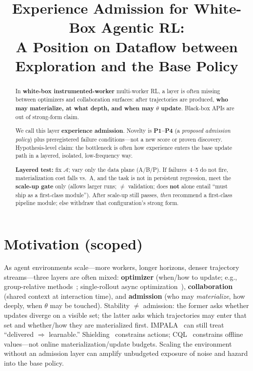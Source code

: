 \documentclass{article}
\title{Experience Admission for White-Box Agentic RL:\\
A Position on Dataflow between Exploration and the Base Policy}
\begin{document}
\maketitle

\begin{abstract}
In \textbf{white-box instrumented-worker} multi-worker RL, a layer is often missing between optimizers and collaboration surfaces: after trajectories are produced, \textbf{who may materialize, at what depth, and when may \(\theta\) update}. Black-box APIs are out of strong-form claim.

We call this layer \textbf{experience admission}. Novelty is \textbf{P1--P4} (a \emph{proposed admission policy}) plus preregistered failure conditions---not a new score or proven discovery. Hypothesis-level claim: the bottleneck is often how experience enters the base update path in a layered, isolated, low-frequency way.

\textbf{Layered test:} fix \(\mathcal{A}\); vary only the data plane (A/B/P). If failures~4--5 do not fire, materialization cost falls vs.\ A, and the task is not in persistent regression, meet the \textbf{scale-up gate} only (allows larger runs; \(\neq\) validation; does \textbf{not} alone entail ``must ship as a first-class module''). After scale-up still passes, \emph{then} recommend a first-class pipeline module; else withdraw that configuration's strong form.
\end{abstract}

\section{Motivation (scoped)}
\label{sec:motivation}

As agent environments scale---more workers, longer horizons, denser trajectory streams---three layers are often mixed: \textbf{optimizer} (when/how to update; e.g., group-relative methods~\citep{shao2024deepseekmath}; single-rollout async optimization~\citep{hou2026single}), \textbf{collaboration} (shared context at interaction time), and \textbf{admission} (who may \emph{materialize}, how deeply, when \(\theta\) may be touched). Stability \(\neq\) admission: the former asks whether updates diverge on a visible set; the latter asks which trajectories may enter that set and whether/how they are materialized first. IMPALA~\citep{espeholt2018impala} can still treat ``delivered \(\Rightarrow\) learnable.'' Shielding~\citep{alshiekh2018safe} constrains actions; CQL~\citep{kumar2020conservative} constrains offline values---not online materialization/update budgets. Scaling the environment without an admission layer can amplify unbudgeted exposure of noise and hazard into the base policy.
\end{document}
